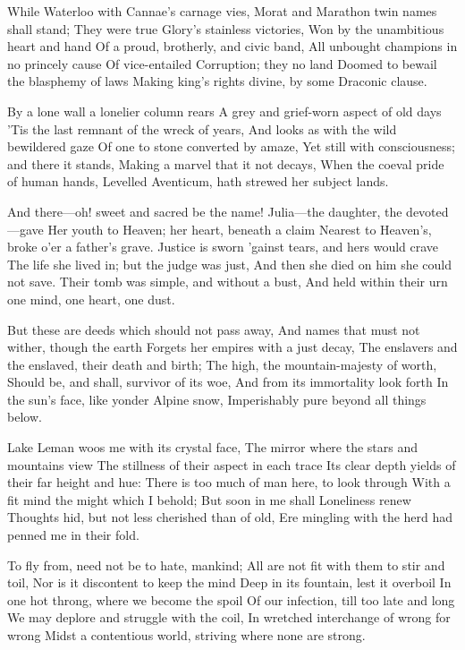 \documentclass[10pt,twocolumn]{book}
\begin{document}
   While Waterloo with Cannae's carnage vies,
   Morat and Marathon twin names shall stand;
   They were true Glory's stainless victories,
   Won by the unambitious heart and hand
   Of a proud, brotherly, and civic band,
   All unbought champions in no princely cause
   Of vice-entailed Corruption; they no land
   Doomed to bewail the blasphemy of laws
Making king's rights divine, by some Draconic clause.


   By a lone wall a lonelier column rears
   A grey and grief-worn aspect of old days
   'Tis the last remnant of the wreck of years,
   And looks as with the wild bewildered gaze
   Of one to stone converted by amaze,
   Yet still with consciousness; and there it stands,
   Making a marvel that it not decays,
   When the coeval pride of human hands,
Levelled Aventicum, hath strewed her subject lands.


   And there---oh! sweet and sacred be the name!\textemdash
   Julia---the daughter, the devoted---gave
   Her youth to Heaven; her heart, beneath a claim
   Nearest to Heaven's, broke o'er a father's grave.
   Justice is sworn 'gainst tears, and hers would crave
   The life she lived in; but the judge was just,
   And then she died on him she could not save.
   Their tomb was simple, and without a bust,
And held within their urn one mind, one heart, one dust.


   But these are deeds which should not pass away,
   And names that must not wither, though the earth
   Forgets her empires with a just decay,
   The enslavers and the enslaved, their death and birth;
   The high, the mountain-majesty of worth,
   Should be, and shall, survivor of its woe,
   And from its immortality look forth
   In the sun's face, like yonder Alpine snow,
Imperishably pure beyond all things below.


   Lake Leman woos me with its crystal face,
   The mirror where the stars and mountains view
   The stillness of their aspect in each trace
   Its clear depth yields of their far height and hue:
   There is too much of man here, to look through
   With a fit mind the might which I behold;
   But soon in me shall Loneliness renew
   Thoughts hid, but not less cherished than of old,
Ere mingling with the herd had penned me in their fold.


   To fly from, need not be to hate, mankind;
   All are not fit with them to stir and toil,
   Nor is it discontent to keep the mind
   Deep in its fountain, lest it overboil
   In one hot throng, where we become the spoil
   Of our infection, till too late and long
   We may deplore and struggle with the coil,
   In wretched interchange of wrong for wrong
Midst a contentious world, striving where none are strong.
\end{document}
